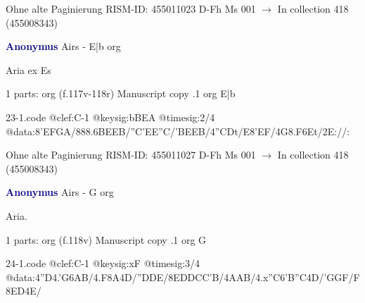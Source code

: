 \documentclass[twocolumn]{book}
\begin{document}
\newline Ohne alte Paginierung
\newline RISM-ID: 455011023
\newline D-Fh  Ms 001
\newline $\rightarrow$ In collection 418 (455008343)
      
\newline \par \vspace{7pt} \textcolor{darkblue}{\textbf{Anonymus  }}
\newline Airs - E|b
\newline org
\newline \begin{itshape}[f.117v, heading:] Aria ex Es\end{itshape} 
\newline \textcolor{darkblue}{}  1 parts: org  (f.117v-118r)
\newline Manuscript copy
.1  org  E|b  
\begin{filecontents*}{23-1.code}
@clef:C-1
@keysig:bBEA
@timesig:2/4
@data:{8'EF}{GA}/888.6{BE}{EB}/{''C'E}{E''C}/{'BE}{EB}/4''CDt/E{8'EF}/4G{8.F6Et}/2E://:
\end{filecontents*}
\newline
%

\newline Ohne alte Paginierung
\newline RISM-ID: 455011027
\newline D-Fh  Ms 001
\newline $\rightarrow$ In collection 418 (455008343)
      
\newline \par \vspace{7pt} \textcolor{darkblue}{\textbf{Anonymus  }}
\newline Airs - G
\newline org
\newline \begin{itshape}[f.118v, heading:] Aria.\end{itshape} 
\newline \textcolor{darkblue}{}  1 parts: org  (f.118v)
\newline Manuscript copy
.1  org  G  
\begin{filecontents*}{24-1.code}
@clef:C-1
@keysig:xF
@timesig:3/4
@data:4''D4.'G{6AB}/4.F8A4D/''DDE/{8EDDCC'B}/4AAB/4.x''C{6'B''C}4D/'GGF/F{8ED}4E/
\end{filecontents*}
\newline
%
\end{document}

